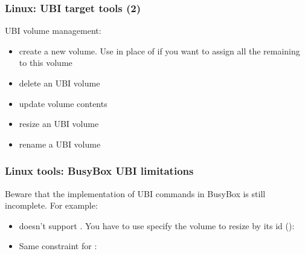 \begin{frame}
  \frametitle{Linux: UBI target tools (2)}
  UBI volume management:
    \begin{itemize}
    \item {} create
      a new volume. Use  in place of  if you want
      to assign all the remaining to this volume
    \item {} delete an UBI
      volume
    \item {}
      update volume contents
    \item {}
      resize an UBI volume
    \item {}
      rename a UBI volume
    \end{itemize}
\end{frame}

\begin{frame}
  \frametitle{Linux tools: BusyBox UBI limitations}
  Beware that the implementation of UBI commands in BusyBox is still
  incomplete. For example:
  \begin{itemize}
    \item {} doesn't support . You have
      to use specify the volume to resize by its id ():\\
    \item Same constraint for :\\
    \end{itemize}
\end{frame} 

